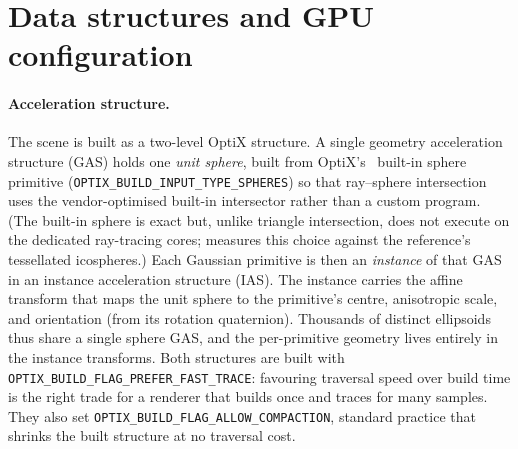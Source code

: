 \section{Data structures and GPU configuration}
\label{sec:gpu-impl}

\paragraph{Acceleration structure.} The scene is built as a two-level OptiX structure. A single
geometry acceleration structure (GAS) holds one \emph{unit sphere}, built from OptiX's~\cite{Optix} built-in sphere
primitive (\texttt{OPTIX\_BUILD\_INPUT\_TYPE\_SPHERES}) so that ray--sphere intersection uses the
vendor-optimised built-in intersector rather than a custom program. (The built-in sphere is exact but,
unlike triangle intersection, does not execute on the dedicated ray-tracing cores;
 measures this choice against the reference's tessellated icospheres.) Each Gaussian primitive is then an \emph{instance} of that
GAS in an instance acceleration structure (IAS). The instance carries the affine transform that maps
the unit sphere to the primitive's centre, anisotropic scale, and orientation (from its rotation
quaternion). Thousands of distinct ellipsoids thus share a single sphere GAS, and the per-primitive
geometry lives entirely in the instance transforms. Both structures are built with
\texttt{OPTIX\_BUILD\_FLAG\_PREFER\_FAST\_TRACE}: favouring traversal speed over build time is the
right trade for a renderer that builds once and traces for many samples. They also set
\texttt{OPTIX\_BUILD\_FLAG\_ALLOW\_COMPACTION}, standard practice that shrinks the built
structure at no traversal cost.

